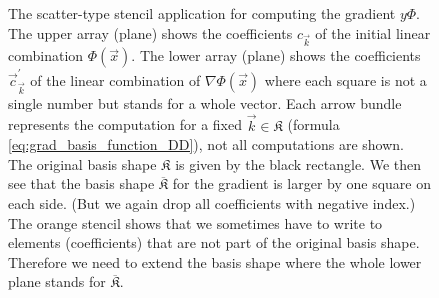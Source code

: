 \begin{figure}
  \centering
  
  \caption[Scatter-type stencil in 2D] {The scatter-type stencil application for
           computing the gradient $y\Phi$. The upper array (plane) shows the
           coefficients $c_{\vec{k}}$ of the initial linear combination $\Phi(\vec{x})$.
           The lower array (plane) shows the coefficients $\vec{c}^\prime_{\vec{k}}$ of the
           linear combination of $\nabla\Phi(\vec{x})$ where each square is not a single
           number but stands for a whole vector. Each arrow bundle represents the
           computation for a fixed $\vec{k} \in \mathfrak{K}$ (formula
           \eqref{eq:grad_basis_function_DD}), not all computations are shown.
           The original basis shape $\mathfrak{K}$ is given by the black rectangle.
           We then see that the basis shape $\overline{\mathfrak{K}}$ for the gradient
           is larger by one square on each side. (But we again drop all coefficients
           with negative index.)
           The orange stencil shows that we sometimes have to write to elements
           (coefficients) that are not part of the original basis shape. Therefore
           we need to extend the basis shape where the whole lower plane stands
           for $\overline{\mathfrak{K}}$.
}
  \label{fig:grad_phi_kl_scatter_stencil_2D}
\end{figure}

